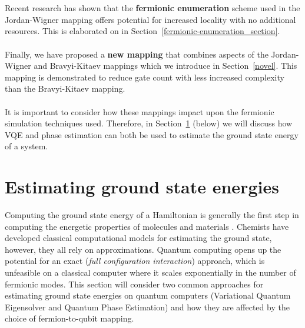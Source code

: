 \documentclass[twoside]{article}
\begin{document}
\\\\
Recent research \cite{fermionicEncoding} has shown that the \textbf{fermionic enumeration} scheme used in the Jordan-Wigner mapping offers potential for increased locality with no additional resources. This is elaborated on in Section~\ref{fermionic-enumeration_section}.
\\\\
Finally, we have proposed a \textbf{new mapping} that combines aspects of the Jordan-Wigner and Bravyi-Kitaev mappings which we introduce in Section~\ref{novel}. This mapping is demonstrated to reduce gate count with less increased complexity than the Bravyi-Kitaev mapping.\\\\
It is important to consider how these mappings impact upon the fermionic simulation techniques used. Therefore, in Section~\ref{applications_section} (below) we will discuss how VQE and phase estimation can both be used to estimate the ground state energy of a system.
\section{Estimating ground state energies}\label{applications_section}
Computing the ground state energy of a Hamiltonian is generally the first step in computing the energetic properties of molecules and materials \cite{vqe}. Chemists have developed classical computational models for estimating the ground state, however, they all rely on approximations. Quantum computing opens up the potential for an exact (\textit{full configuration interaction}) approach, which is unfeasible on a classical computer where it scales exponentially in the number of fermionic modes. This section will consider two common approaches for estimating ground state energies on quantum computers (Variational Quantum Eigensolver and Quantum Phase Estimation) and how they are affected by the choice of fermion-to-qubit mapping.
\end{document}
